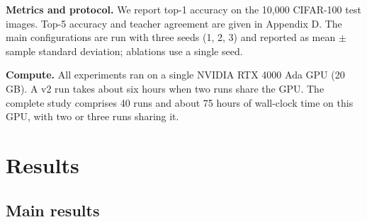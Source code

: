 \documentclass[
  10pt,
]{article}
\begin{document}
\textbf{Metrics and protocol.} We report top-1 accuracy on the 10,000
CIFAR-100 test images. Top-5 accuracy and teacher agreement are given in
Appendix D. The main configurations are run with three seeds (1, 2, 3)
and reported as mean \(\pm\) sample standard deviation; ablations use a
single seed.

\textbf{Compute.} All experiments ran on a single NVIDIA RTX 4000 Ada
GPU (20 GB). A v2 run takes about six hours when two runs share the GPU.
The complete study comprises 40 runs and about 75 hours of wall-clock
time on this GPU, with two or three runs sharing it.

\hypertarget{results}{%
\section{Results}\label{results}}

\hypertarget{main-results}{%
\subsection{Main results}\label{main-results}}
\end{document}
